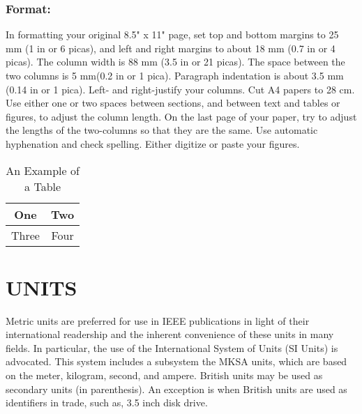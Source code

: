 \documentclass[letterpaper, 10 pt, conference]{ieeeconf}  %
\begin{document}
\subsubsection{Format:} In formatting your original 8.5" x 11" page, set top and
bottom margins to 25 mm (1 in or 6 picas), and left and right margins
to about 18 mm (0.7 in or 4 picas). The column width is 88 mm (3.5 in or 21 picas).
 The space between the two columns is 5 mm(0.2 in or 1 pica). Paragraph
 indentation is about 3.5 mm (0.14 in or 1 pica). Left- and right-justify your
 columns. Cut A4 papers to 28 cm. Use either one or two spaces between sections,
 and between text and tables or figures, to adjust the column length.
  On the last page of your paper, try to adjust the lengths of the
  two-columns so that they are the same. Use automatic hyphenation and
   check spelling. Either digitize or paste your figures.

\begin{table}
\caption{An Example of a Table}
\label{table_example}
\begin{center}
\begin{tabular}{|c||c|}
\hline
One & Two\\
\hline
Three & Four\\
\hline
\end{tabular}
\end{center}
\end{table}


\section{UNITS}

Metric units are preferred for use in IEEE publications in light of their
international readership and the inherent convenience of these units in many fields.
In particular, the use of the International System of Units (SI Units) is advocated.
 This system includes a subsystem the MKSA units, which are based on the
 meter, kilogram, second, and ampere. British units may be used as secondary units
 (in parenthesis). An exception is when British units are used as identifiers in trade,
 such as, 3.5 inch disk drive.


\addtolength{\textheight}{-3cm}   %
\end{document}
